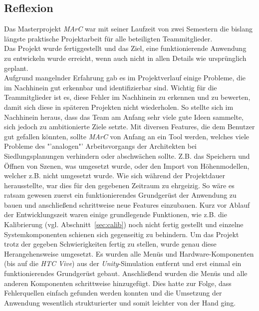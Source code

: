 \subsection{Reflexion}\label{sec:reflexion}
Das Masterprojekt \textit{MArC} war mit seiner Laufzeit von zwei Semestern die bislang längste praktische Projektarbeit für alle beteiligten Teammitglieder. \\
Das Projekt wurde fertiggestellt und das Ziel, eine funktionierende Anwendung zu entwickeln wurde erreicht, wenn auch nicht in allen Details wie ursprünglich geplant.\\
Aufgrund mangelnder Erfahrung gab es im Projektverlauf einige Probleme, die im Nachhinein gut erkennbar und identifizierbar sind. Wichtig für die Teammitglieder ist es, diese Fehler im Nachhinein zu erkennen und zu bewerten, damit sich diese in späteren Projekten nicht wiederholen. So stellte sich im Nachhinein heraus, dass das Team am Anfang sehr viele gute Ideen sammelte, sich jedoch zu ambitionierte Ziele setzte. Mit diversen Features, die dem Benutzer gut gefallen könnten, sollte \emph{MArC} von Anfang an ein Tool werden, welches viele Probleme des "'analogen"' Arbeitsvorgangs der Architekten bei Siedlungsplanungen verhindern oder abschwächen sollte. Z.B. das Speichern und Öffnen von Szenen, was umgesetzt wurde, oder den Import von Höhenmodellen, welcher z.B. nicht umgesetzt wurde.
Wie sich während der Projektdauer herausstellte, war dies für den gegebenen Zeitraum zu ehrgeizig.
So wäre es ratsam gewesen zuerst ein funktionierendes Grundgerüst der Anwendung zu bauen und anschließend schrittweise neue Features einzubauen. Kurz vor Ablauf der Entwicklungszeit waren einige grundlegende Funktionen, wie z.B. die Kalibrierung (vgl. Abschnitt~\ref{sec:calib}) noch nicht fertig gestellt und einzelne Systemkomponenten schienen sich gegenseitig zu behindern. Um das Projekt trotz der gegeben Schwierigkeiten fertig zu stellen, wurde genau diese Herangehensweise umgesetzt. Es wurden alle Menüs und Hardware-Komponenten (bis auf die \textit{HTC Vive}) aus der \textit{Unity}-Simulation entfernt und erst einmal ein funktionierendes Grundgerüst gebaut. Anschließend wurden die Menüs und alle anderen Komponenten schrittweise hinzugefügt. Dies hatte zur Folge, dass Fehlerquellen einfach gefunden werden konnten und die Umsetzung der Anwendung wesentlich strukturierter und somit leichter von der Hand ging.\\
